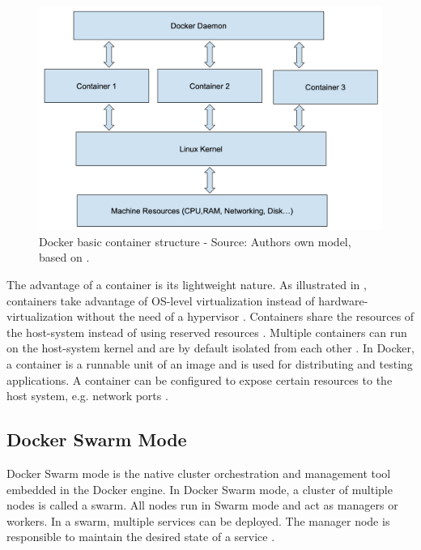 \begin{figure}[h]
\centering
\includegraphics[scale=0.8]{images/04_technical_background/docker_basic_container_structure}
\caption{Docker basic container structure - Source: Authors own model, based on \cite{Bullington2020Docker}.}
\label{fig:docker_container_struct}
\end{figure}

The advantage of a container is its lightweight nature. As illustrated in , containers take advantage of OS-level virtualization instead of hardware-virtualization without the need of a hypervisor \cite{Docker2020Docs, Nickoloff2019Docker}. Containers share the resources of the host-system instead of using reserved resources \cite{Bullington2020Docker}. Multiple containers can run on the host-system kernel and are by default isolated from each other \cite{Docker2020Docs}.
In Docker, a container is a runnable unit of an image and is used for distributing and testing applications. A container can be configured to expose certain resources to the host system, e.g. network ports \cite{Bullington2020Docker}.


\subsection{Docker Swarm Mode}
\label{subsec:04_docker_swarm}
Docker Swarm mode is the native cluster orchestration and management tool embedded in the Docker engine.
In Docker Swarm mode, a cluster of multiple nodes is called a swarm. All nodes run in Swarm mode and act as managers or workers.
In a swarm, multiple services can be deployed. The manager node is responsible to maintain the desired state of a service \cite{Docker2020Docs}.


